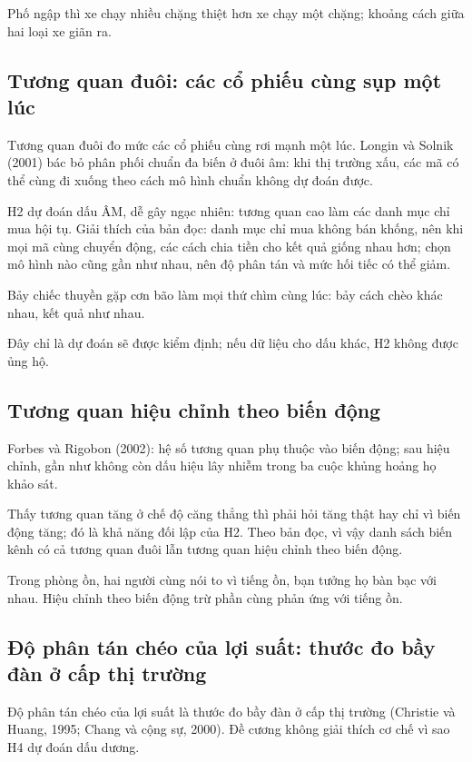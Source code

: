 Phố ngập thì xe chạy nhiều chặng thiệt hơn xe chạy một chặng; khoảng cách giữa hai loại xe giãn ra.

\subsection{Tương quan đuôi: các cổ phiếu cùng sụp một lúc}

Tương quan đuôi đo mức các cổ phiếu cùng rơi mạnh một lúc. Longin và Solnik (2001) bác bỏ phân phối chuẩn đa biến ở đuôi âm: khi thị trường xấu, các mã có thể cùng đi xuống theo cách mô hình chuẩn không dự đoán được.

H2 dự đoán dấu ÂM, dễ gây ngạc nhiên: tương quan cao làm các danh mục chỉ mua hội tụ. Giải thích của bản đọc: danh mục chỉ mua không bán khống, nên khi mọi mã cùng chuyển động, các cách chia tiền cho kết quả giống nhau hơn; chọn mô hình nào cũng gần như nhau, nên độ phân tán và mức hối tiếc có thể giảm.

Bảy chiếc thuyền gặp cơn bão làm mọi thứ chìm cùng lúc: bảy cách chèo khác nhau, kết quả như nhau.

Đây chỉ là dự đoán sẽ được kiểm định; nếu dữ liệu cho dấu khác, H2 không được ủng hộ.

\subsection{Tương quan hiệu chỉnh theo biến động}

Forbes và Rigobon (2002): hệ số tương quan phụ thuộc vào biến động; sau hiệu chỉnh, gần như không còn dấu hiệu lây nhiễm trong ba cuộc khủng hoảng họ khảo sát.

Thấy tương quan tăng ở chế độ căng thẳng thì phải hỏi tăng thật hay chỉ vì biến động tăng; đó là khả năng đối lập của H2. Theo bản đọc, vì vậy danh sách biến kênh có cả tương quan đuôi lẫn tương quan hiệu chỉnh theo biến động.

Trong phòng ồn, hai người cùng nói to vì tiếng ồn, bạn tưởng họ bàn bạc với nhau. Hiệu chỉnh theo biến động trừ phần cùng phản ứng với tiếng ồn.

\subsection{Độ phân tán chéo của lợi suất: thước đo bầy đàn ở cấp thị trường}

Độ phân tán chéo của lợi suất là thước đo bầy đàn ở cấp thị trường (Christie và Huang, 1995; Chang và cộng sự, 2000). Đề cương không giải thích cơ chế vì sao H4 dự đoán dấu dương.

